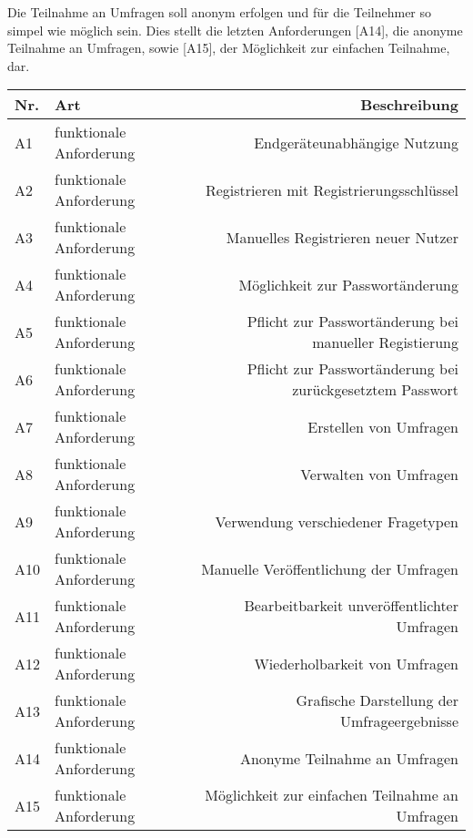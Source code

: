Die Teilnahme an Umfragen soll anonym erfolgen und für die Teilnehmer so simpel wie möglich sein.
Dies stellt die letzten Anforderungen [A14], die anonyme Teilnahme an Umfragen, sowie [A15], der Möglichkeit zur einfachen Teilnahme, dar.

\begin{tabularx}{\textwidth}{|l|k|r|}
  \hline
  {Nr.} & {Art} & {Beschreibung} \\
  \hline
  {\label{Anf:A1}A1} & funktionale Anforderung & Endgeräteunabhängige Nutzung\\
  \hline
  {\label{Anf:A2}A2} & funktionale Anforderung & Registrieren mit Registrierungsschlüssel \\
  \hline
  {\label{Anf:A3}A3} & funktionale Anforderung & Manuelles Registrieren neuer Nutzer \\
  \hline
  {\label{Anf:A4}A4} & funktionale Anforderung & Möglichkeit zur Passwortänderung \\
  \hline
  {\label{Anf:A5}A5} & funktionale Anforderung & Pflicht zur Passwortänderung bei manueller Registierung \\
  \hline
  {\label{Anf:A6}A6} & funktionale Anforderung & Pflicht zur Passwortänderung bei zurückgesetztem Passwort \\
  \hline
  {\label{Anf:A7}A7} & funktionale Anforderung & Erstellen von Umfragen \\
  \hline
  {\label{Anf:A8}A8} & funktionale Anforderung & Verwalten von Umfragen \\
  \hline
  {\label{Anf:A9}A9} & funktionale Anforderung & Verwendung verschiedener Fragetypen \\
  \hline
  {\label{Anf:A10}A10} & funktionale Anforderung & Manuelle Veröffentlichung der Umfragen \\
  \hline
  {\label{Anf:A11}A11} & funktionale Anforderung & Bearbeitbarkeit unveröffentlichter Umfragen \\
  \hline
  {\label{Anf:A12}A12} & funktionale Anforderung & Wiederholbarkeit von Umfragen \\
  \hline
  {\label{Anf:A13}A13} & funktionale Anforderung & Grafische Darstellung der Umfrageergebnisse \\
  \hline
  {\label{Anf:A14}A14} & funktionale Anforderung & Anonyme Teilnahme an Umfragen \\
  \hline
  {\label{Anf:A15}A15} & funktionale Anforderung & Möglichkeit zur einfachen Teilnahme an Umfragen \\
  \bottomrule
\end{tabularx}
